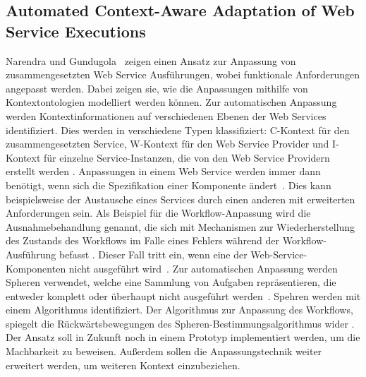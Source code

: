 \documentclass[conference,compsoc]{IEEEtran}
\begin{document}
\subsection{Automated Context-Aware Adaptation of Web Service Executions}
Narendra und Gundugola~\cite{narendra2006automated} zeigen einen Ansatz zur Anpassung von zusammengesetzten Web Service Ausführungen, wobei funktionale Anforderungen angepasst werden. Dabei zeigen sie, wie die Anpassungen mithilfe von Kontextontologien modelliert werden können. Zur automatischen Anpassung werden Kontextinformationen auf verschiedenen Ebenen der Web Services identifiziert. Dies werden in verschiedene Typen klassifiziert: C-Kontext für den zusammengesetzten Service, W-Kontext für den Web Service Provider und I-Kontext für einzelne Service-Instanzen, die von den Web Service Providern erstellt werden \cite{narendra2006automated}. Anpassungen in einem Web Service werden immer dann benötigt, wenn sich die Spezifikation einer Komponente ändert~\cite{narendra2006automated}. Dies kann beispielsweise der Austausche eines Services durch einen anderen mit erweiterten Anforderungen sein.
Als Beispiel für die Workflow-Anpassung wird die Ausnahmebehandlung genannt, die sich mit Mechanismen zur Wiederherstellung des Zustands des Workflows im Falle eines Fehlers während der Workflow-Ausführung befasst \cite{narendra2006automated}. Dieser Fall tritt ein, wenn eine der Web-Service-Komponenten nicht ausgeführt wird~\cite{narendra2006automated}.
Zur automatischen Anpassung werden Spheren verwendet, welche eine Sammlung von Aufgaben repräsentieren, die entweder komplett oder überhaupt nicht ausgeführt werden~\cite{narendra2006automated}. Spehren werden mit einem Algorithmus identifiziert. Der Algorithmus zur Anpassung des Workflows, spiegelt die Rückwärtsbewegungen des Spheren-Bestimmungsalgorithmus wider \cite{narendra2006automated}.
Der Ansatz soll in Zukunft noch in einem Prototyp implementiert werden, um die Machbarkeit zu beweisen. Außerdem sollen die Anpassungstechnik weiter erweitert werden, um weiteren Kontext einzubeziehen.
\end{document}
